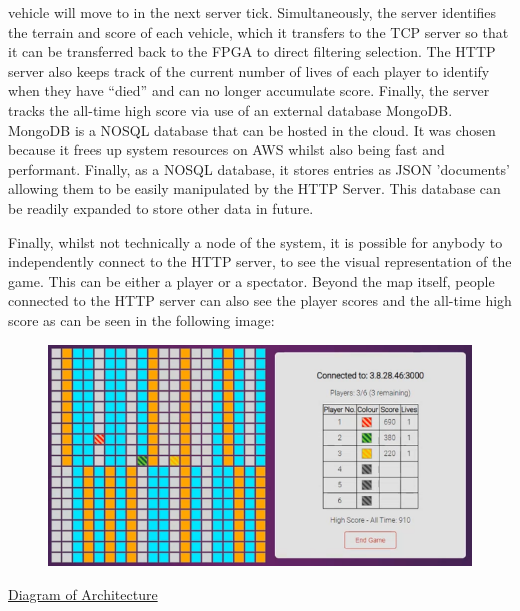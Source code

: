 \documentclass[12pt,a4paper]{article}
\begin{document}
{vehicle will move to in the next server tick. Simultaneously, the server identifies 
the terrain and score of each vehicle, which it transfers to the TCP server so that 
it can be transferred back to the FPGA to direct filtering selection. The HTTP 
server also keeps track of the current number of lives of each player to identify 
when they have “died” and can no longer accumulate score. Finally, the server tracks 
the all-time high score via use of an external database MongoDB. MongoDB is a NOSQL 
database that can be hosted in the cloud. It was chosen because it frees up system 
resources on AWS whilst also being fast and performant. Finally, as a NOSQL database, 
it stores entries as JSON 'documents' allowing them to be easily manipulated by the 
HTTP Server. This database can be readily expanded to store other data in future. 
\par
Finally, whilst not technically a node of the system, it is possible for anybody to 
independently connect to the HTTP server, to see the visual representation of the 
game. This can be either a player or a spectator. Beyond the map itself, people 
connected to the HTTP server can also see the player scores and the all-time high 
score as can be seen in the following image:}
\par
\begin{figure} [h!]
    \centering
    \includegraphics[scale = 0.75]{Website.png}
\end{figure}
\par
\underline{\scriptsize Diagram of Architecture}
\par
\end{document}
